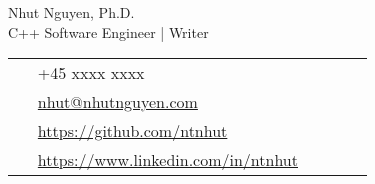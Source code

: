 \documentclass[11pt]{article} %
\begin{document}
\begin{paracol}{2}


\parbox[top][0.12\textheight][c]{\linewidth}{ %
	\vspace{-0.04\textheight} %
	\centering %
	{\sffamily\Huge Nhut Nguyen, Ph.D.}\\\medskip %
    \centering
    {\sffamily C++ Software Engineer | Writer }
}

\switchcolumn %

\parbox[top][0.12\textheight][c]{\linewidth}{ %
	\vspace{-0.04\textheight} %
	\colorbox{shade}{ %
		\begin{supertabular}{p{0.05\linewidth}|p{0.775\linewidth}} %
			\raisebox{-1pt}{\faPhone} & +45 xxxx xxxx \\ %
			\raisebox{0pt}{\small\faEnvelope} & \href{mailto:nhut@nhutnguyen.com}{nhut@nhutnguyen.com} \\ %
			\raisebox{-1pt}{\faGithub} & \href{https://github.com/ntnhut}{https://github.com/ntnhut} \\ %
			\raisebox{-1pt}{\faLinkedinSquare} & \href{https://www.linkedin.com/in/ntnhut}{https://www.linkedin.com/in/ntnhut} \\ %
		\end{supertabular}
	}
}


\end{paracol}
\end{document}
